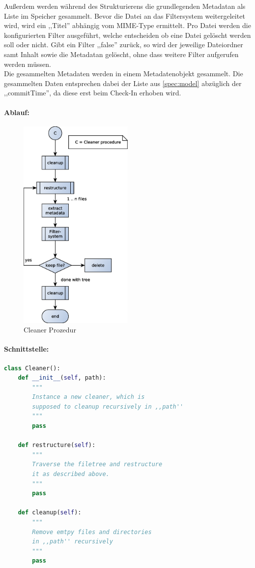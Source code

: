 Außerdem werden während des Strukturierens die grundlegenden Metadatan als Liste im Speicher gesammelt.
Bevor die Datei an das Filtersystem weitergeleitet wird, wird ein ,,Titel'' abhängig vom MIME-Type ermittelt.
Pro Datei werden die konfigurierten Filter ausgeführt, welche entscheiden ob eine Datei gelöscht werden soll oder nicht.
Gibt ein Filter ,,false'' zurück, so wird der jeweilige Dateiordner samt Inhalt sowie die Metadatan gelöscht,
ohne dass weitere Filter aufgerufen werden müssen.
\\
Die gesammelten Metadaten werden in einem Metadatenobjekt gesammelt. Die gesammelten Daten entsprechen dabei 
der Liste aus \ref{spec:model} abzüglich der ,,commitTime'', da diese erst beim Check-In erhoben wird.
\newpage
\paragraph{Ablauf:}
\label{par:ablauf_}
\hfill
\begin{figure}[H]
	\centering
	\includegraphics[width=0.5\textwidth]{design/backend/gfx/cleaner.eps}
	\caption{Cleaner Prozedur}
\end{figure}
\paragraph{Schnittstelle:} 
\label{par:schnittstelle_}
\hfill
\begin{lstlisting}[language=python]
class Cleaner():
    def __init__(self, path):
        """
        Instance a new cleaner, which is
        supposed to cleanup recursively in ,,path''
        """
        pass

    def restructure(self): 
        """
        Traverse the filetree and restructure
        it as described above.
        """
        pass
  
    def cleanup(self):
        """
        Remove emtpy files and directories
        in ,,path'' recursively
        """
        pass
\end{lstlisting}


